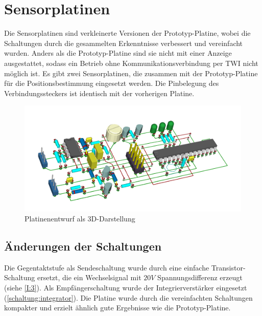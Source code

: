\section{Sensorplatinen}
Die Sensorplatinen sind verkleinerte Versionen der Prototyp-Platine, wobei die Schaltungen durch die gesammelten Erkenntnisse verbessert und vereinfacht wurden. Anders als die Prototyp-Platine sind sie nicht mit einer Anzeige ausgestattet, sodass ein Betrieb ohne Kommunikationsverbindung per \ac{TWI} nicht möglich ist. Es gibt zwei Sensorplatinen, die zusammen mit der Prototyp-Platine für die Positionsbestimmung eingesetzt werden. Die Pinbelegung des Verbindungssteckers ist identisch mit der vorherigen Platine.

\begin{figure}[H]
	\centering
	\includegraphics[width=(\textwidth)]{images/endplatine_3d.png}
	\caption{Platinenentwurf als 3D-Darstellung} \label{img:endplatine3d}
\end{figure}


\subsection{Änderungen der Schaltungen}
Die Gegentaktstufe als Sendeschaltung wurde durch eine einfache Transistor-Schaltung ersetzt, die ein Wechselsignal mit $20V$ Spannungsdifferenz erzeugt (siehe \ref{I:3}). Als Empfängerschaltung wurde der Integrierverstärker eingesetzt (\ref{schaltung:integrator}). Die Platine wurde durch die vereinfachten Schaltungen kompakter und erzielt ähnlich gute Ergebnisse wie die Prototyp-Platine.


